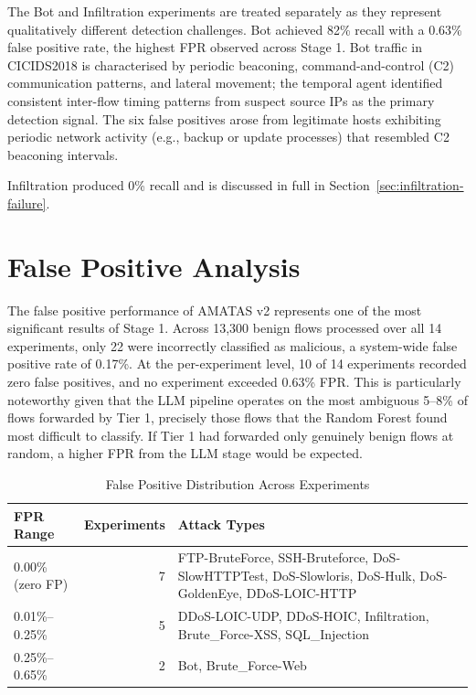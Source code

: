 The Bot and Infiltration experiments are treated separately as they represent qualitatively different detection challenges. Bot achieved 82\% recall with a 0.63\% false positive rate, the highest FPR observed across Stage 1. Bot traffic in CICIDS2018 is characterised by periodic beaconing, command-and-control (C2) communication patterns, and lateral movement; the temporal agent identified consistent inter-flow timing patterns from suspect source IPs as the primary detection signal. The six false positives arose from legitimate hosts exhibiting periodic network activity (e.g., backup or update processes) that resembled C2 beaconing intervals.

Infiltration produced 0\% recall and is discussed in full in Section~\ref{sec:infiltration-failure}.

\section{False Positive Analysis}
\label{sec:false-positive-analysis}

The false positive performance of AMATAS v2 represents one of the most significant results of Stage 1. Across 13,300 benign flows processed over all 14 experiments, only 22 were incorrectly classified as malicious, a system-wide false positive rate of 0.17\%. At the per-experiment level, 10 of 14 experiments recorded zero false positives, and no experiment exceeded 0.63\% FPR. This is particularly noteworthy given that the LLM pipeline operates on the most ambiguous 5--8\% of flows forwarded by Tier 1, precisely those flows that the Random Forest found most difficult to classify. If Tier 1 had forwarded only genuinely benign flows at random, a higher FPR from the LLM stage would be expected.

\begin{table}[H]
\centering
\caption{False Positive Distribution Across Experiments}
\label{tab:fp-distribution}
\begin{tabularx}{\textwidth}{l r X}
\toprule
FPR Range & Experiments & Attack Types \\
\midrule
0.00\% (zero FP) & 7 & FTP-BruteForce, SSH-Bruteforce, DoS-SlowHTTPTest, DoS-Slowloris, DoS-Hulk, DoS-GoldenEye, DDoS-LOIC-HTTP \\
0.01\%--0.25\% & 5 & DDoS-LOIC-UDP, DDoS-HOIC, Infiltration, Brute\_Force-XSS, SQL\_Injection \\
0.25\%--0.65\% & 2 & Bot, Brute\_Force-Web \\
\bottomrule
\end{tabularx}
\end{table}

